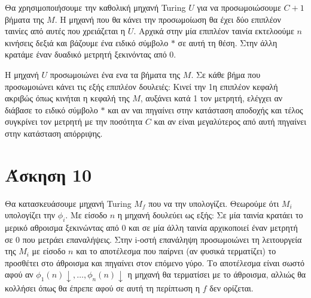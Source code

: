 \documentclass[11pt]{article}
\begin{document}
Θα χρησιμοποιήσουμε την καθολική μηχανή Turing $U$ για να προσωμοιώσουμε $C+1$ βήματα της $M$. 
Η μηχανή που θα κάνει την προσωμοίωση θα έχει δύο επιπλέον ταινίες από αυτές που χρειάζεται 
η $U$. Αρχικά στην μία επιπλέον ταινία εκτελοούμε $n$ κινήσεις δεξιά και βάζουμε ένα ειδικό 
σύμβολο $*$ σε αυτή τη θέση. Στην άλλη κρατάμε έναν δυαδικό μετρητή ξεκινόντας από $0$. 

Η μηχανή $U$ προσωμοιώνει ένα ενα τα βήματα της $Μ$. Σε κάθε βήμα που προσωμοιώνει κάνει τις εξής
επιπλέον δουλειές: Κινεί την 1η επιπλέον κεφαλή ακριβώς όπως κινήται η κεφαλή της $M$, αυξάνει 
κατά 1 τον μετρητή, ελέγχει αν διάβασε το ειδικό σύμβολο $*$ και αν ναι πηγαίνει στην κατάσταση αποδοχής 
και τέλος συγκρίνει τον μετρητή με την ποσότητα $C$ και αν είναι μεγαλύτερος από αυτή πηγαίνει 
στην κατάσταση απόρριψης.
                                                              



\section*{Άσκηση 10}
Θα κατασκευάσουμε μηχανή Turing $M_f$ που να την υπολογίζει. Θεωρούμε ότι $M_i$ υπολογίζει την $\phi_i$.
Με είσοδο $n$ η μηχανή δουλεύει ως εξής: Σε μία ταινία κρατάει το μερικό αθροισμα ξεκινώντας από 0 και σε μία
άλλη ταινία αρχικοποιεί έναν μετρητή σε 0 που μετράει επαναλήψεις. Στην i-οστή επανάληψη προσωμοιώνει τη λειτουργεία
της $M_i$ με είσοδο $n$ και το αποτέλεσμα που παίρνει (αν φυσικά τερματίζει) το προσθέτει στο άθροισμα και πηγαίνει στον
επόμενο γύρο. Το αποτέλεσμα είναι σωστό αφού αν $\phi_1(n)\downarrow,\ldots,\phi_n(n)\downarrow$ η μηχανή θα τερματίσει
με το άθροισμα, αλλιώς θα κολλήσει όπως θα έπρεπε αφού σε αυτή τη περίπτωση η $f$ δεν ορίζεται.





\end{document}
